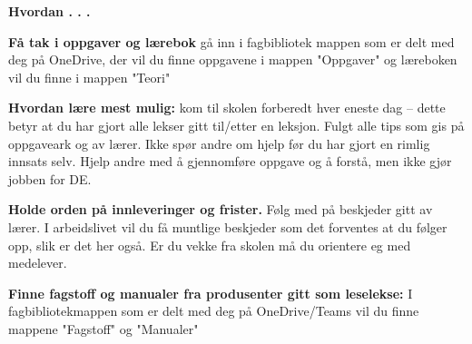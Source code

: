 

\centerline{\bf Hvordan . . .} \bigskip 

\noindent
{\bf Få tak i oppgaver og lærebok} gå inn i fagbibliotek mappen som er delt med deg på OneDrive, der vil du finne oppgavene i mappen "Oppgaver" og læreboken vil du finne i mappen "Teori" 


\vskip 10pt

\noindent
{\bf Hvordan lære mest mulig:} kom til skolen forberedt hver eneste dag -- dette betyr at du har gjort alle lekser gitt til/etter en leksjon. Fulgt alle tips som gis på oppgaveark og av lærer. Ikke spør andre om hjelp før du har gjort en rimlig innsats selv. Hjelp andre med å gjennomføre oppgave og å forstå, men ikke gjør jobben for DE. 


\vskip 10pt

\noindent
{\bf Holde orden på innleveringer og frister.} Følg med på beskjeder gitt av lærer. I arbeidslivet vil du få muntlige beskjeder som det forventes at du følger opp, slik er det her også. Er du vekke fra skolen må du orientere eg med medelever. 

\vskip 10pt

\noindent


\noindent
{\bf Finne fagstoff og manualer fra produsenter gitt som leselekse:} I fagbibliotekmappen som er delt med deg på OneDrive/Teams vil du finne mappene "Fagstoff" og  "Manualer" 



